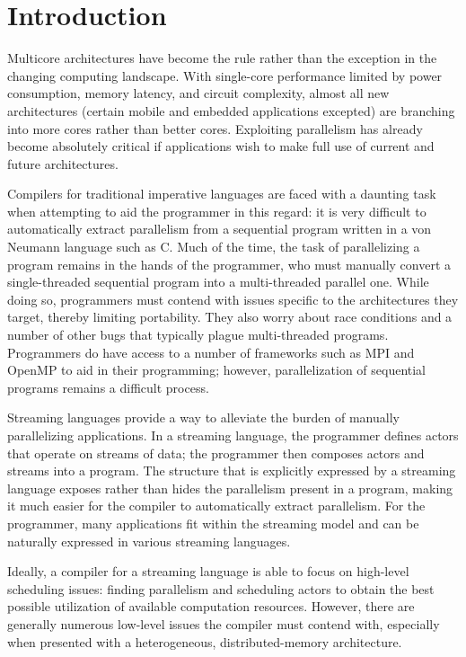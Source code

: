 \section{Introduction}

Multicore architectures have become the rule rather than the exception
in the changing computing landscape. With single-core performance
limited by power consumption, memory latency, and circuit complexity,
almost all new architectures (certain mobile and embedded applications
excepted) are branching into more cores rather than better
cores. Exploiting parallelism has already become absolutely critical
if applications wish to make full use of current and future
architectures.

Compilers for traditional imperative languages are faced with a
daunting task when attempting to aid the programmer in this regard: it
is very difficult to automatically extract parallelism from a
sequential program written in a von Neumann language such as C. Much
of the time, the task of parallelizing a program remains in the hands
of the programmer, who must manually convert a single-threaded
sequential program into a multi-threaded parallel one. While doing so,
programmers must contend with issues specific to the architectures
they target, thereby limiting portability. They also worry about race
conditions and a number of other bugs that typically plague
multi-threaded programs. Programmers do have access to a number of
frameworks such as MPI and OpenMP to aid in their programming;
however, parallelization of sequential programs remains a difficult
process.

Streaming languages provide a way to alleviate the burden of manually
parallelizing applications. In a streaming language, the programmer
defines actors that operate on streams of data; the programmer then
composes actors and streams into a program. The structure that is
explicitly expressed by a streaming language exposes rather than hides
the parallelism present in a program, making it much easier for the
compiler to automatically extract parallelism. For the programmer,
many applications fit within the streaming model and can be naturally
expressed in various streaming languages.

Ideally, a compiler for a streaming language is able to focus on
high-level scheduling issues: finding parallelism and scheduling
actors to obtain the best possible utilization of available
computation resources. However, there are generally numerous low-level
issues the compiler must contend with, especially when presented with
a heterogeneous, distributed-memory architecture.

